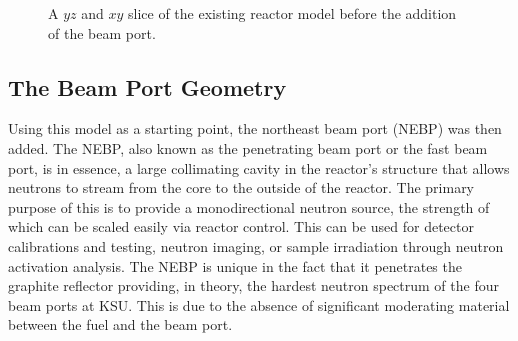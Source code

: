 \begin{figure}
\centering
{} 
\caption[Old Reactor Model]{A $yz$ and $xy$ slice of the existing reactor model before the addition of the beam port.}
\label{fig:existing}
\end{figure}


\subsection{The Beam Port Geometry}

Using this model as a starting point, the northeast beam port (NEBP) was then added.
The NEBP, also known as the penetrating beam port or the fast beam port, is in essence, a large collimating cavity in the reactor's structure that allows neutrons to stream from the core to the outside of the reactor.
The primary purpose of this is to provide a monodirectional neutron source, the strength of which can be scaled easily via reactor control.
This can be used for detector calibrations and testing, neutron imaging, or sample irradiation through neutron activation analysis.
The NEBP is unique in the fact that it penetrates the graphite reflector providing, in theory, the hardest neutron spectrum of the four beam ports at KSU.
This is due to the absence of significant moderating material between the fuel and the beam port.

